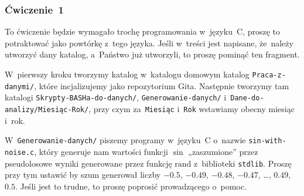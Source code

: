 \documentclass[10pt,t]{beamer}
\begin{document}







\begin{frame}
  \frametitle{Ćwiczenie~1}


  To ćwiczenie będzie wymagało trochę programowania w~języku~C,
  proszę to potraktować jako powtórkę z~tego języka. Jeśli w~treści jest
  napisane, że~należy utworzyć dany katalog, a~Państwo już utworzyli, to
  proszę pominąć ten fragment.

  W~pierwszy kroku tworzymy katalog w~katalogu domowym katalog
  \texttt{Praca-z-danymi/}, które incjalizujemy jako repozytorium Gita.
  Następnie tworzymy tam katalogi \texttt{Skrypty-BASHa-do-danych/},
  \texttt{Generowanie-danych/} i~\texttt{Dane-do-analizy/Miesiąc-Rok/},
  przy czym za~\texttt{Miesiąc} i~\texttt{Rok} wstawiamy obecny miesiąc
  i~rok.

  W~\texttt{Generowanie-danych/} piszemy programy w~języku~C o~nazwie
  \texttt{sin-with-noise.c}, który generuje nam wartości funkcji $\sin$
  „zaszumione” przez pseudolosowe wyniki generowane przez funkcję
  $\text{rand}$ z~biblioteki \texttt{stdlib}. Proszę przy tym ustawić by
  szum generował liczby $-0.5$, $-0.49$, $-0.48$, $-0.47$, \ldots,
  $0.49$,~$0.5$. Jeśli jest to trudne, to proszę poprosić prowadzącego
  o~pomoc.

\end{frame}
\end{document}
